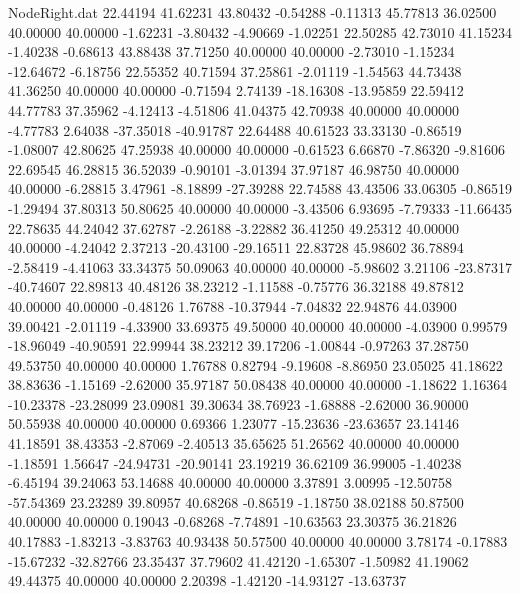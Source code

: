 \begin{filecontents}{NodeRight.dat}
  22.44194   41.62231   43.80432    -0.54288   -0.11313   45.77813   36.02500   40.00000   40.00000   -1.62231   -3.80432   -4.90669   -1.02251
  22.50285   42.73010   41.15234    -1.40238   -0.68613   43.88438   37.71250   40.00000   40.00000   -2.73010   -1.15234  -12.64672   -6.18756
  22.55352   40.71594   37.25861    -2.01119   -1.54563   44.73438   41.36250   40.00000   40.00000   -0.71594    2.74139  -18.16308  -13.95859
  22.59412   44.77783   37.35962    -4.12413   -4.51806   41.04375   42.70938   40.00000   40.00000   -4.77783    2.64038  -37.35018  -40.91787
  22.64488   40.61523   33.33130    -0.86519   -1.08007   42.80625   47.25938   40.00000   40.00000   -0.61523    6.66870   -7.86320   -9.81606
  22.69545   46.28815   36.52039    -0.90101   -3.01394   37.97187   46.98750   40.00000   40.00000   -6.28815    3.47961   -8.18899  -27.39288
  22.74588   43.43506   33.06305    -0.86519   -1.29494   37.80313   50.80625   40.00000   40.00000   -3.43506    6.93695   -7.79333  -11.66435
  22.78635   44.24042   37.62787    -2.26188   -3.22882   36.41250   49.25312   40.00000   40.00000   -4.24042    2.37213  -20.43100  -29.16511
  22.83728   45.98602   36.78894    -2.58419   -4.41063   33.34375   50.09063   40.00000   40.00000   -5.98602    3.21106  -23.87317  -40.74607
  22.89813   40.48126   38.23212    -1.11588   -0.75776   36.32188   49.87812   40.00000   40.00000   -0.48126    1.76788  -10.37944   -7.04832
  22.94876   44.03900   39.00421    -2.01119   -4.33900   33.69375   49.50000   40.00000   40.00000   -4.03900    0.99579  -18.96049  -40.90591
  22.99944   38.23212   39.17206    -1.00844   -0.97263   37.28750   49.53750   40.00000   40.00000    1.76788    0.82794   -9.19608   -8.86950
  23.05025   41.18622   38.83636    -1.15169   -2.62000   35.97187   50.08438   40.00000   40.00000   -1.18622    1.16364  -10.23378  -23.28099
  23.09081   39.30634   38.76923    -1.68888   -2.62000   36.90000   50.55938   40.00000   40.00000    0.69366    1.23077  -15.23636  -23.63657
  23.14146   41.18591   38.43353    -2.87069   -2.40513   35.65625   51.26562   40.00000   40.00000   -1.18591    1.56647  -24.94731  -20.90141
  23.19219   36.62109   36.99005    -1.40238   -6.45194   39.24063   53.14688   40.00000   40.00000    3.37891    3.00995  -12.50758  -57.54369
  23.23289   39.80957   40.68268    -0.86519   -1.18750   38.02188   50.87500   40.00000   40.00000    0.19043   -0.68268   -7.74891  -10.63563
  23.30375   36.21826   40.17883    -1.83213   -3.83763   40.93438   50.57500   40.00000   40.00000    3.78174   -0.17883  -15.67232  -32.82766
  23.35437   37.79602   41.42120    -1.65307   -1.50982   41.19062   49.44375   40.00000   40.00000    2.20398   -1.42120  -14.93127  -13.63737

\end{filecontents}
